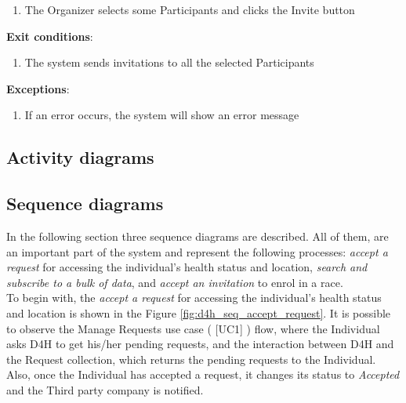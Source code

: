 \documentclass[hidelinks, 12pt]{report}
\newcommand\usecase[1]{ [UC#1] }
\begin{document}
\begin{itemize}
\begin{enumerate}
			\item{The Organizer selects some Participants and clicks the Invite button}
		\end{enumerate}
		\textbf{Exit conditions}:
		\begin{enumerate}
			\item{The system sends invitations to all the selected Participants}
		\end{enumerate}
		\textbf{Exceptions}:
		\begin{enumerate}
			\item{If an error occurs, the system will show an error message}
		\end{enumerate}
		\end{itemize}
	
	\subsection{Activity diagrams}
	
	\subsection{Sequence diagrams}
	In the following section three sequence diagrams are described. All of them, are an important part of the system and represent the following processes: \textit{accept a request} for accessing the individual's health status and location, \textit{search and subscribe to a bulk of data}, and \textit{accept an invitation} to enrol in a race.\\
	
	To begin with, the \textit{accept a request} for accessing the individual's health status and location is shown in the Figure \ref{fig:d4h_seq_accept_request}. It is possible to observe the Manage Requests use case (\usecase{1}) flow, where the Individual asks D4H to get his/her pending requests, and the interaction between D4H and the Request collection, which returns the pending requests to the Individual. Also, once the Individual has accepted a request, it changes its status to \textit{Accepted} and the Third party company is notified. \\
	
\end{document}
